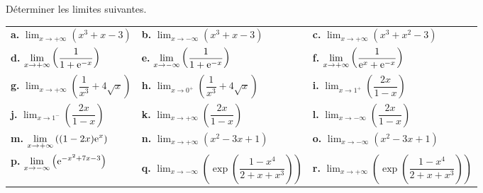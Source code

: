\documentclass[11pt,fleqn, openany]{book} %
\begin{document}
\begin{exercise}Déterminer les limites suivantes.

\renewcommand{\arraystretch}{2}
\begin{tabularx}{\linewidth}{XXX}

\textbf{a.} $\displaystyle \lim_{x \to +\infty}(x^3+x-3)$ &\textbf{b.} $\displaystyle \lim_{x \to -\infty}(x^3+x-3)$ & \textbf{c.} $\displaystyle \lim_{x \to +\infty}(x^3+x^2-3)$ \\
\textbf{d.} $\displaystyle \lim_{x \to +\infty}\left(\dfrac{1}{1+\mathrm{e}^{-x}}\right)$ &\textbf{e.} $\displaystyle \lim_{x \to -\infty}\left(\dfrac{1}{1+\mathrm{e}^{-x}}\right)$ &\textbf{f.} $\displaystyle \lim_{x \to +\infty}\left(\dfrac{1}{\mathrm{e}^x+\mathrm{e}^{-x}}\right)$ \\
\textbf{g.} $\displaystyle \lim_{x \to +\infty}\left(\dfrac{1}{x^3}+4\sqrt{x}\right)$ &\textbf{h.} $\displaystyle \lim_{x \to 0^+}\left(\dfrac{1}{x^3}+4\sqrt{x}\right)$ &\textbf{i.} $\displaystyle \lim_{x \to 1^+}\left( \dfrac{2x}{1-x}\right)$ \\
\textbf{j.} $\displaystyle \lim_{x \to 1^-}\left( \dfrac{2x}{1-x}\right)$ &\textbf{k.} $\displaystyle \lim_{x \to +\infty}\left( \dfrac{2x}{1-x}\right)$ & \textbf{l.} $\displaystyle \lim_{x \to -\infty}\left( \dfrac{2x}{1-x}\right)$ \\
\textbf{m.} $\displaystyle \lim_{x \to +\infty}\left( (1-2x)\mathrm{e}^x\right)$ &\textbf{n.} $\displaystyle \lim_{x \to +\infty}\left( x^2-3x+1\right)$ &\textbf{o.} $\displaystyle \lim_{x \to -\infty}\left( x^2-3x+1\right)$\\
\textbf{p.} $\displaystyle \lim_{x \to -\infty}\left( \mathrm{e}^{-x^2+7x-3}\right)$ &\textbf{q.} $\displaystyle \lim_{x \to -\infty}\left( \exp\left( \dfrac{1-x^4}{2+x+x^3}\right)\right)$  &\textbf{r.} $\displaystyle \lim_{x \to +\infty}\left( \exp\left( \dfrac{1-x^4}{2+x+x^3}\right)\right)$\end{tabularx}

\end{exercise}
\end{document}
